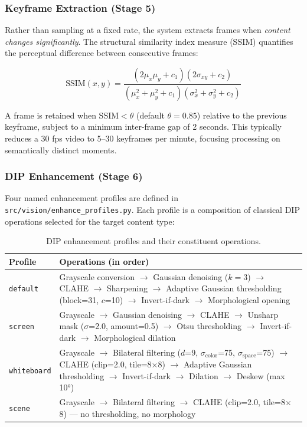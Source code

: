 \documentclass[12pt,a4paper]{article}
\begin{document}
\subsubsection{Keyframe Extraction (Stage 5)}
Rather than sampling at a fixed rate, the system extracts frames when \emph{content
changes significantly}. The structural similarity index measure (SSIM)
\cite{ssim2004} quantifies the perceptual difference between consecutive frames:

\begin{equation}
  \mathrm{SSIM}(x,y) = \frac{(2\mu_x\mu_y + c_1)(2\sigma_{xy} + c_2)}
                            {(\mu_x^2 + \mu_y^2 + c_1)(\sigma_x^2 + \sigma_y^2 + c_2)}
\end{equation}

A frame is retained when $\mathrm{SSIM} < \theta$ (default $\theta = 0.85$) relative to
the previous keyframe, subject to a minimum inter-frame gap of 2 seconds. This
typically reduces a 30 fps video to 5--30 keyframes per minute, focusing processing
on semantically distinct moments.

\subsubsection{DIP Enhancement (Stage 6)}
\label{subsubsec:enhance}
Four named enhancement profiles are defined in
\texttt{src/vision/enhance\_profiles.py}. Each profile is a composition of classical
DIP operations selected for the target content type:

\begin{table}[H]
\centering
\caption{DIP enhancement profiles and their constituent operations.}
\label{tab:profiles}
\begin{tabular}{@{}lp{8.5cm}@{}}
\toprule
\textbf{Profile} & \textbf{Operations (in order)} \\
\midrule
\texttt{default} & Grayscale conversion $\to$ Gaussian denoising ($k=3$) $\to$ CLAHE
  $\to$ Sharpening $\to$ Adaptive Gaussian thresholding (block=31, $c$=10)
  $\to$ Invert-if-dark $\to$ Morphological opening \\
\addlinespace
\texttt{screen} & Grayscale $\to$ Gaussian denoising $\to$ CLAHE $\to$ Unsharp mask
  ($\sigma$=2.0, amount=0.5) $\to$ Otsu thresholding $\to$ Invert-if-dark
  $\to$ Morphological dilation \\
\addlinespace
\texttt{whiteboard} & Grayscale $\to$ Bilateral filtering ($d$=9,
  $\sigma_\text{color}$=75, $\sigma_\text{space}$=75) $\to$ CLAHE (clip=2.0,
  tile=8$\times$8) $\to$ Adaptive Gaussian thresholding $\to$ Invert-if-dark
  $\to$ Dilation $\to$ Deskew (max 10°) \\
\addlinespace
\texttt{scene} & Grayscale $\to$ Bilateral filtering $\to$ CLAHE (clip=2.0,
  tile=8$\times$8) — no thresholding, no morphology \\
\bottomrule
\end{tabular}
\end{table}
\end{document}

